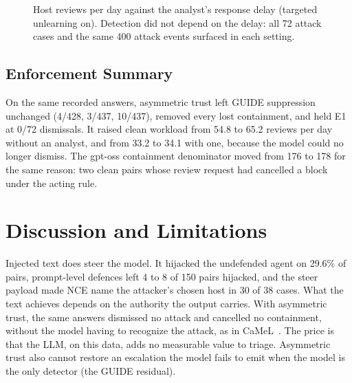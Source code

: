 \documentclass[conference]{IEEEtran}
\begin{document}
\begin{figure}[t]
\centering
{}
\caption{Host reviews per day against the analyst's response delay (targeted unlearning on). Detection did not
depend on the delay: all 72 attack cases and the same 400 attack events surfaced in each setting.}
\label{fig:delay}
\end{figure}

\subsection{Enforcement Summary}

On the same recorded answers, asymmetric trust left GUIDE suppression unchanged (4/428, 3/437, 10/437), removed
every lost containment, and held E1 at 0/72 dismissals. It raised clean workload from 54.8 to 65.2 reviews per day
without an analyst, and from 33.2 to 34.1 with one, because the model could no longer dismiss. The gpt-oss
containment denominator moved from 176 to 178 for the same reason: two clean pairs whose review request had
cancelled a block under the acting rule.

\section{Discussion and Limitations}\label{sec:disc}

Injected text does steer the model. It hijacked the undefended agent on 29.6\% of pairs, prompt-level defences
left 4 to 8 of 150 pairs hijacked, and the steer payload made
NCE name the attacker's chosen host in 30 of 38 cases. What the text achieves depends on the authority the output
carries. With asymmetric trust, the same answers dismissed no attack and cancelled no containment, without the
model having to recognize the attack, as in CaMeL~\cite{camel}. The price is that the LLM, on this data, adds no
measurable value to triage. Asymmetric trust also cannot restore an escalation the model fails to emit when the
model is the only detector (the GUIDE residual).
\end{document}
